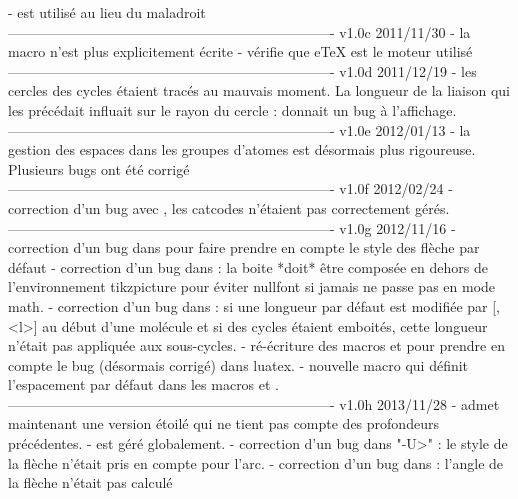     - \box\z@ est utilis\'e au lieu du maladroit \unhbox\z@
----------------------------------------------------------------------
v1.0c      2011/11/30
    - la macro \+ n'est plus explicitement \'ecrite
    - v\'erifie que eTeX est le moteur utilis\'e
----------------------------------------------------------------------
v1.0d      2011/12/19
    - les cercles des cycles \'etaient trac\'es au mauvais moment. La
      longueur de la liaison qui les pr\'ec\'edait influait sur le
      rayon du cercle :  donnait un bug
      \`a l'affichage.
----------------------------------------------------------------------
v1.0e      2012/01/13
    - la gestion des espaces dans les groupes d'atomes est
      d\'esormais plus rigoureuse. Plusieurs bugs ont \'et\'e
      corrig\'e
----------------------------------------------------------------------
v1.0f      2012/02/24
    - correction d'un bug avec , les catcodes n'\'etaient
      pas correctement g\'er\'es.
----------------------------------------------------------------------
v1.0g      2012/11/16
    - correction d'un bug dans \CF@direct@arrow pour faire prendre en
      compte le style des fl\`eche par d\'efaut
    - correction d'un bug dans \CF@lewis@iii : la boite *doit* \^etre
      compos\'ee en dehors de l'environnement tikzpicture pour
      \'eviter nullfont si jamais \printatom ne passe pas en mode
      math.
    - correction d'un bug dans \CF@chemfig@iv : si une longueur par
      d\'efaut est modifi\'ee par [,<l>] au d\'ebut d'une mol\'ecule
      et si des cycles \'etaient emboit\'es, cette longueur n'\'etait
      pas appliqu\'ee aux sous-cycles.
    - r\'e-\'ecriture des macros \chemabove et \chembemow pour
      prendre en compte le bug (d\'esormais corrig\'e) dans luatex.
    - nouvelle macro \setstacksep qui d\'efinit l'espacement par
      d\'efaut dans les macros \chemabove et \chembelow.
----------------------------------------------------------------------
v1.0h      2013/11/28
    - \chemname admet maintenant une version \'etoil\'e qui ne tient
      pas compte des profondeurs pr\'ec\'edentes.
    - \CF@dp@max est g\'er\'e globalement.
    - correction d'un bug dans "-U>" : le style de la flèche n'était
      pris en compte pour l'arc.
    - correction d'un bug dans \CF@direct@arrow : l'angle de la
      fl\`eche n'\'etait pas calcul\'e